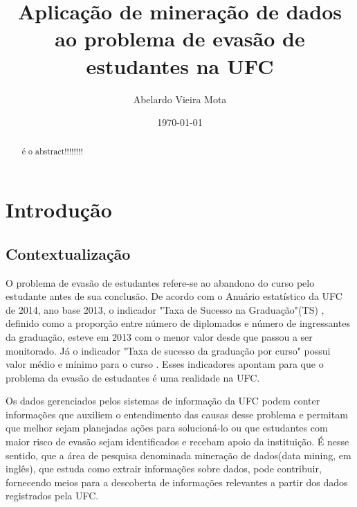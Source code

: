 \documentclass[a4paper]{article}
\title{Aplicação de mineração de dados ao problema de evasão de estudantes na UFC}
\author{Abelardo Vieira Mota}
\date{\today}
\begin{document}
\maketitle

\begin{abstract}
é o abstract!!!!!!!!
\end{abstract}

\tableofcontents

\section{Introdução}

\subsection{Contextualização}
O problema de evasão de estudantes refere-se ao abandono do curso pelo estudante antes de sua conclusão. De acordo com o Anuário estatístico da UFC de 2014, ano base 2013, o indicador "Taxa de Sucesso na Graduação"(TS) , definido como a proporção entre número de diplomados e número de ingressantes da graduação, esteve em 2013 com o menor valor desde que passou a ser monitorado. Já o indicador "Taxa de sucesso da graduação por curso"  possui valor médio  e mínimo  para o curso . Esses indicadores apontam para que o problema da evasão de estudantes é uma realidade na UFC. 

Os dados gerenciados pelos sistemas de informação da UFC podem conter informações que auxiliem o entendimento das causas desse problema e permitam que melhor sejam planejadas ações para solucioná-lo ou que estudantes com maior risco de evasão sejam identificados e recebam apoio da instituição. É nesse sentido, que a área de pesquisa denominada mineração de dados(data mining, em inglês), que estuda como extrair informações sobre dados, pode contribuir, fornecendo meios para a descoberta de informações relevantes a partir dos dados registrados pela UFC.
\end{document}
